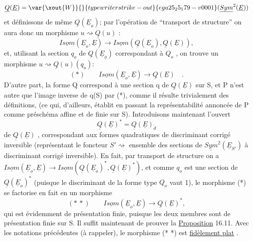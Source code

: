 
\[ \underline{Q}(\underline{E}) =\var{\xout{W}}{}{typewriter strike-out}{ega25_25_179-v0001}(\underline{Sym}^2(\underline{E})) \]
et définissons de même $\underline{Q}(\underline{E}_o)$; par l'opération de ``transport de
structure'' on aura donc un morphisme $u \rightsquigarrow \underline{Q}(u)$ :
\[ \underline{Isom}(\underline{E}_o,\underline{E}) \longrightarrow \underline{Isom}(\underline{Q}(\underline{E}_o),\underline{Q}(\underline{E})), \]
et, utilisant la section $q_o$ de $\underline{Q}(\underline{E}_o)$ correspondant à $Q_o$ , on trouve un
morphisme $u \rightsquigarrow \underline{Q}(u)(q_o)$:
\[ (*) \qquad \underline{Isom}(\underline{E}_o,\underline{E}) \longrightarrow \underline{Q}(\underline{E}) \quad . \]
D'autre part, la forme Q  correspond à une section q de $\underline{Q}(\underline{E})$ sur S,
et P n'est autre que l'image inverse de q(S) par (*), comme il résulte
trivialement des définitions, (ce qui, d'ailleurs, établit en passant la
représentabilité annoncée de P comme préschéma affine et de  finie
sur S). Introduisons maintenant l'ouvert 
\[ \underline{Q}(\underline{E})^* = \underline{Q}(\underline{E})_{\tilde{d}} \]
de $\underline{Q}(\underline{E})$ , correspondant aux formes quadratiques de discriminant corrigé
inversible (représentant le foncteur $S' \rightsquigarrow$ ensemble des 
sections de $\underline{Sym}^2(\underline{E}_{S'})$ à discriminant corrigé inversible). En fait,
par transport de structure on a $\underline{Isom}(\underline{E}_o,\underline{E}) \rightarrow \underline{Isom}(\underline{Q}(\underline{E}_o)^*,\underline{Q}(\underline{E})^*)$, et
comme $q_o$ est une section de $\underline{Q}(\underline{E}_o)^*$ (puisque le discriminant  de
la forme type $Q_o$ vaut 1), le morphisme (*) se factorise en fait en un
morphisme
\[ (*\,*) \qquad \underline{Isom}(\underline{E}_o,\underline{E}) \rightarrow \underline{Q}(\underline{E})^* , \]
qui est évidemment de présentation finie, puisque les deux membres sont de
présentation finie sur S. Il suffit maintenant de prouver la
 \uline{Proposition} 16.11. Avec les notations précédentes (à rappeler),
le morphisme (* *) est \uline{fidèlement plat} .

